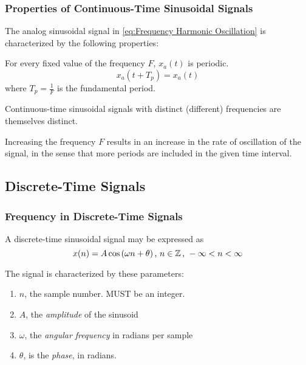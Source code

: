 \subsubsection{Properties of Continuous-Time Sinusoidal Signals}\label{subsubsec:Properties Continuous-Time Sinusoids}
The analog sinusoidal signal in \cref{eq:Frequency Harmonic Oscillation} is characterized by the following properties:
\begin{propertylist}
\item For every fixed value of the frequency $F$, $x_{a}(t)$ is periodic.
  \begin{equation*}
    x_{a}(t+T_{p}) = x_{a}(t)
  \end{equation*}
  where $T_{p} = \frac{1}{F}$ is the fundamental period.
\item Continuous-time sinusoidal signals with distinct (different) frequencies are themselves distinct.
\item Increasing the frequency $F$ results in an increase in the rate of oscillation of the signal, in the sense that more periods are included in the given time interval.
\end{propertylist}

\subsection{Discrete-Time Signals}\label{subsec:Discrete-Time Signals}
\subsubsection{Frequency in Discrete-Time Signals}\label{subsubsec:Frequency in Discrete-Time Signals}
A discrete-time sinusoidal signal may be expressed as
\begin{equation}\label{eq:Discrete Time Sinusoid}
  x(n) = A \cos \left( \omega n + \theta \right) \text{, } n \in \operatorname{\mathbb{Z}} \text{, } -\infty < n < \infty
\end{equation}

The signal is characterized by these parameters:
\begin{enumerate}[noitemsep]
\item $n$, the sample number. MUST be an integer.
\item $A$, the \emph{amplitude} of the sinusoid
\item $\omega$, the \emph{angular frequency} in radians per sample
\item $\theta$, is the \emph{phase}, in radians.
\end{enumerate}

